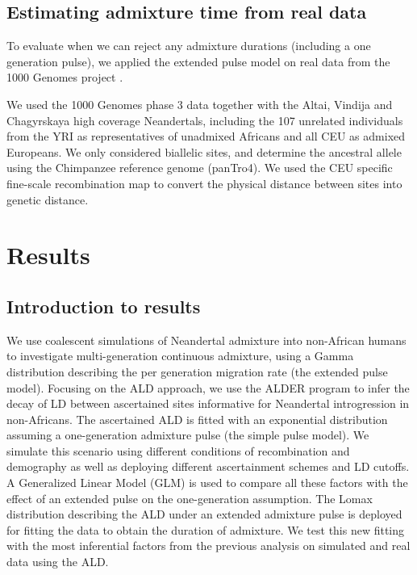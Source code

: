 \documentclass[]{article}
\begin{document}
\subsection{Estimating admixture time from real data}\label{Estimating admixture time from real data}
To evaluate when we can reject any admixture durations (including a one generation pulse), we applied the extended pulse model on real data from the 1000 Genomes project \cite{the_1000_genomes_project_consortium_global_2015}.

We used the 1000 Genomes phase 3 data together with the Altai, Vindija and Chagyrskaya high coverage Neandertals, including the 107 unrelated individuals from the YRI as representatives of unadmixed Africans and all CEU as admixed Europeans. We only considered biallelic sites, and determine the ancestral allele using  the Chimpanzee reference genome (panTro4). We used the CEU specific fine-scale recombination map \citep{spence_inference_2019} to convert the physical distance between sites into genetic distance. 


\section{Results}\label{results}

\subsection{Introduction to results}\label{introduction to result}

We use coalescent simulations of Neandertal admixture into non-African humans to investigate multi-generation continuous admixture, using a Gamma distribution describing the per generation migration rate (the extended pulse model). Focusing on the ALD approach, we use the ALDER program to infer the decay of LD between ascertained sites informative for Neandertal introgression in non-Africans. The ascertained ALD is fitted with an exponential distribution assuming a one-generation admixture pulse (the simple pulse model).  We simulate this scenario using different conditions of recombination and demography as well as deploying different ascertainment schemes and LD cutoffs. A Generalized Linear Model (GLM) is used to compare all these factors with the effect of an extended pulse on the one-generation assumption. The Lomax distribution describing the ALD under an extended admixture pulse is deployed for fitting the data to obtain the duration of admixture. We test this new fitting with the most inferential factors from the previous analysis on simulated and real data using the ALD.
\end{document}

